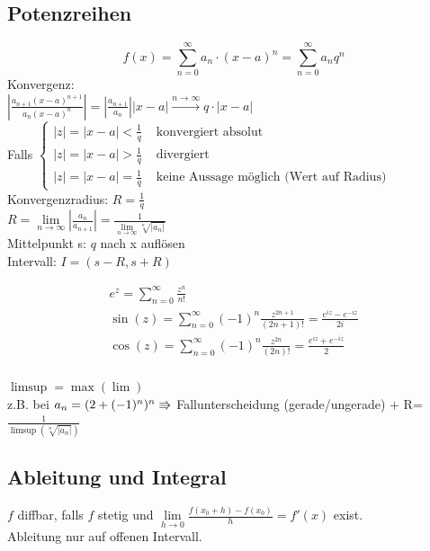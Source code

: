 \documentclass[6pt,a4paper]{scrartcl}
\newcommand{\abs}[1]{\ensuremath{\left\vert#1\right\vert}}
\begin{document}
\begin{multicols}{4}
\subsection{Potenzreihen} %
\begin{equation*}
f(x)=\sum_{n=0}^\infty a_n \cdot (x-a)^n = \sum_{n=0}^\infty a_n q^n
\end{equation*}
Konvergenz:\\
$\abs{\frac{a_{n+1} (x-a)^{n+1}}{a_n (x-a)^n}} = \abs{\frac{a_{n+1}}{a_n}}\abs{x-a} \overset{n \rightarrow \infty}{\rightarrow} q \cdot \abs{x -a}$\\
Falls $\begin{cases}  \abs z = \abs{x-a} < \frac{1}{q} & \text{ konvergiert absolut}\\
	\abs z = \abs{x-a} > \frac{1}{q} & \text{ divergiert} \\
	\abs z = \abs{x-a} = \frac{1}{q}  & \text{ keine Aussage möglich (Wert auf Radius)}
	\end{cases}$\\
Konvergenzradius: $R=\frac{1}{q}$\\
$R = \lim\limits_{n \rightarrow \infty} \abs{\frac{a_n}{a_{n+1}}}=\frac{1}{\lim\limits_{n\rightarrow \infty}\sqrt[n]{\abs{a_n}}}$ \\
Mittelpunkt s: $q$ nach x auflösen \\
Intervall: $I=(s-R, s+R)$ 

\label{sub:potenzreihen}
 \begin{eqnarray*}
 	e^z = \sum_{n = 0}^{\infty} \frac{z^n}{n!}\\
	\sin (z) = \sum_{n = 0}^{\infty} (-1)^n \frac{z^{2n +1}}{(2n +1)!} = \frac{e^{iz} - e^{-iz}}{2i} \\
	\cos (z) = \sum_{n = 0}^{\infty} (-1)^n \frac{z^{2n}}{(2n)!} = \frac{e^{iz} + e^{-iz}}{2}\\
 \end{eqnarray*}

$\limsup=\max(\lim)$ \\
z.B. bei $a_n=(2+(-1)^n)^n \\
\Rrightarrow$ Fallunterscheidung (gerade/ungerade) + R=$\frac{1}{\limsup(\sqrt[n]{|a_n|})}$


\subsection{Ableitung und Integral}
$f$ diffbar, falls $f$ stetig und $\underset{h\rightarrow 0}{\lim}\frac{f(x_0+h)-f(x_0)}{h}=f'(x)$ exist. \\
Ableitung nur auf offenen Intervall.

\end{multicols}
\end{document}
